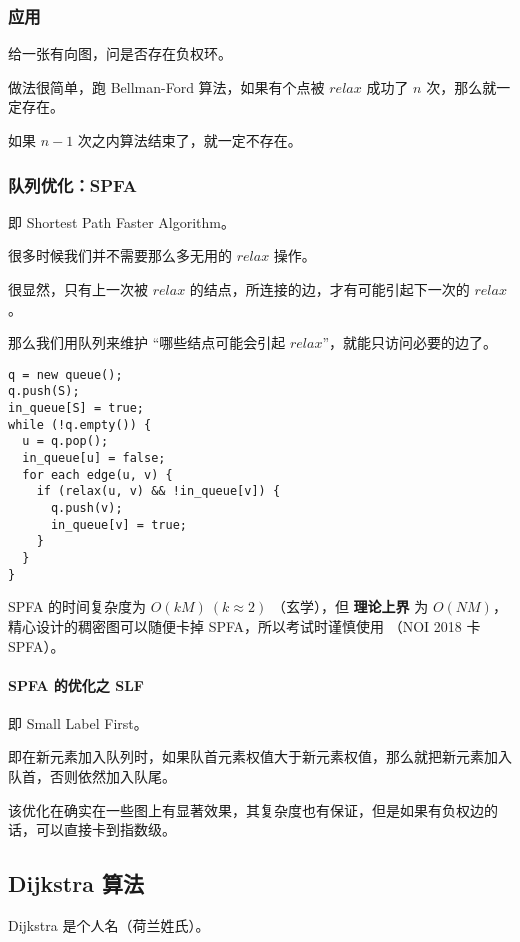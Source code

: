 \subsubsection{应用}

给一张有向图，问是否存在负权环。

做法很简单，跑 Bellman-Ford 算法，如果有个点被 $relax$ 成功了 $n$ 次，那么就一定存在。

如果 $n-1$ 次之内算法结束了，就一定不存在。

\subsubsection{队列优化：SPFA}

即 Shortest Path Faster Algorithm。

很多时候我们并不需要那么多无用的 $relax$ 操作。

很显然，只有上一次被 $relax$ 的结点，所连接的边，才有可能引起下一次的 $relax$。

那么我们用队列来维护 “哪些结点可能会引起 $relax$”，就能只访问必要的边了。

\begin{verbatim}
q = new queue();
q.push(S);
in_queue[S] = true;
while (!q.empty()) {
  u = q.pop();
  in_queue[u] = false;
  for each edge(u, v) {
    if (relax(u, v) && !in_queue[v]) {
      q.push(v);
      in_queue[v] = true;
    }
  }
}
\end{verbatim}

SPFA 的时间复杂度为 $O(kM)~ (k\approx 2)$ （玄学），但 \textbf{理论上界} 为 $O(NM)$，精心设计的稠密图可以随便卡掉 SPFA，所以考试时谨慎使用  （NOI 2018 卡 SPFA）。

\paragraph{SPFA 的优化之 SLF}

即 Small Label First。

即在新元素加入队列时，如果队首元素权值大于新元素权值，那么就把新元素加入队首，否则依然加入队尾。

该优化在确实在一些图上有显著效果，其复杂度也有保证，但是如果有负权边的话，可以直接卡到指数级。

\hr

\subsection{Dijkstra 算法}

Dijkstra 是个人名（荷兰姓氏）。

